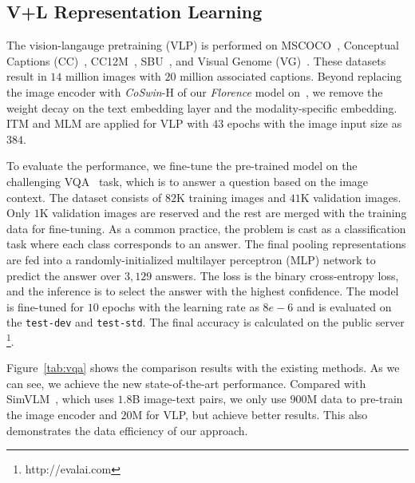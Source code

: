 \documentclass{article}
\begin{document}
\subsection{V+L Representation Learning}
The vision-langauge pretraining (VLP) is performed on
MSCOCO~\cite{lin2015microsoft}, Conceptual Captions (CC)~\cite{sharma2018conceptual},
CC12M~\cite{changpinyo2021cc12m},
SBU~\cite{OrdonezKB11}, and Visual Genome (VG)~\cite{krishnavisualgenome}.
These datasets result in $14$ million images with $20$ million associated captions.
Beyond replacing the image encoder with \emph{CoSwin}-H of
our \emph{Florence} model on~\cite{dou2021empirical}, we
remove the weight decay on the text embedding layer and
the modality-specific embedding.
ITM and MLM are applied for VLP with $43$ epochs with the image input size as $384$.

To evaluate the performance, we fine-tune the pre-trained model on the
challenging VQA~\cite{GoyalKSBP16} task, which is
to answer a question based on the image context.
The dataset consists of $82$K training images and $41$K validation images.
Only $1$K validation images are reserved and the rest are merged with
the training data for fine-tuning.
As a common practice, the problem is cast as a classification task
where each class corresponds to an answer.
The final pooling representations
are fed into a
randomly-initialized multilayer perceptron (MLP) network to predict the answer
over $3,129$ answers.
The loss is the binary cross-entropy loss, and the inference is to select the answer with the
highest confidence.
The model is fine-tuned for $10$ epochs with the learning rate as $8e-6$ and is evaluated
on the \texttt{test-dev} and \texttt{test-std}. The final accuracy is calculated on
the public server \footnote{http://evalai.com}.

Figure~\ref{tab:vqa} shows the comparison results with the existing methods.
As we can see, we achieve the new state-of-the-art performance.
Compared with SimVLM~\cite{wang2021simvlm}, which uses $1.8$B image-text pairs,
we only use $900$M data to pre-train the image encoder and $20$M
for VLP, but achieve better results.
This also demonstrates the data efficiency of our approach.
\end{document}
